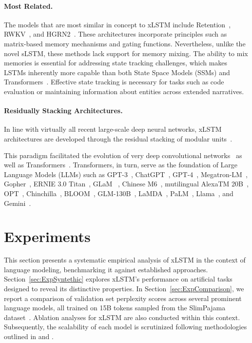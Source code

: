 \paragraph{Most Related.} The models that are most similar in concept to xLSTM include Retention~\citep{Sun:23arxiv}, RWKV~\citep{Peng:23arxivshort,Peng:24arxivshort}, and HGRN2~\citep{Qin:24arxiv}. These architectures incorporate principles such as matrix-based memory mechanisms and gating functions. Nevertheless, unlike the novel sLSTM, these methods lack support for memory mixing. The ability to mix memories is essential for addressing state tracking challenges, which makes LSTMs inherently more capable than both State Space Models (SSMs) and Transformers~\citep{Merrill:24,Deletang:23}. Effective state tracking is necessary for tasks such as code evaluation or maintaining information about entities across extended narratives.

\paragraph{Residually Stacking Architectures.} In line with virtually all recent large-scale deep neural networks, xLSTM architectures are developed through the residual stacking of modular units~\citep{Srivastava:15,He:16}.

This paradigm facilitated the evolution of very deep convolutional networks~\citep{He:16} as well as Transformers~\citep{Vaswani:17}. Transformers, in turn, serve as the foundation of Large Language Models (LLMs) such as GPT-3~\citep{Brown:20short}, ChatGPT~\citep{Schulman:22short}, GPT-4~\citep{Achiam:23gpt4short}, Megatron-LM~\citep{Shoeybi:19}, Gopher~\citep{Rae:21short}, ERNIE 3.0 Titan~\citep{Wang:21arxivshort}, GLaM ~\citep{Du:21glamshort}, Chinese M6~\citep{Lin:21}, mutilingual AlexaTM 20B~\citep{Soltan:22}, OPT~\citep{Zhang:22opt}, Chinchilla~\citep{Hoffmann:22short}, BLOOM~\citep{Scao:22arxivshort}, GLM-130B~\citep{Zeng:22arxivshort}, LaMDA~\citep{Thoppilan:22short}, PaLM~\citep{Chowdhery:22short}, Llama~\citep{Touvron:23arxiv}, and Gemini~\citep{GeminiTeam:23arxiv,Reid:24arxiv}.

\section{Experiments}
\label{sec:Exp}

This section presents a systematic empirical analysis of xLSTM in the context of language modeling, benchmarking it against established approaches. Section~\ref{sec:ExpSyntethic} explores xLSTM’s performance on artificial tasks designed to reveal its distinctive properties. In Section~\ref{sec:ExpComparison}, we report a comparison of validation set perplexity scores across several prominent language models, all trained on 15B tokens sampled from the SlimPajama dataset~\citep{Soboleva:23}. Ablation analyses for xLSTM are also conducted within this context. Subsequently, the scalability of each model is scrutinized following methodologies outlined in \citet{Kaplan:20} and \citet{Brown:20short}. 

